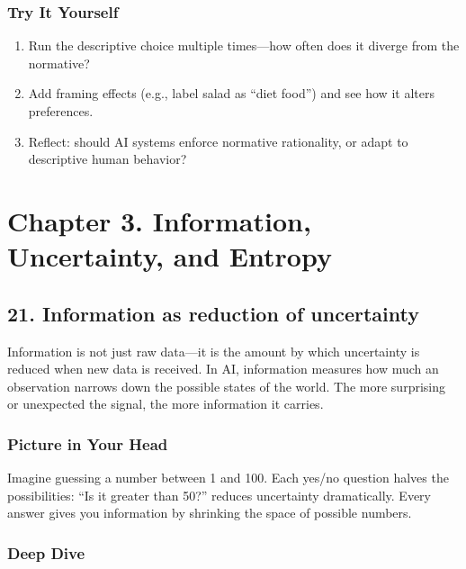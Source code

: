 \documentclass[
  letterpaper,
  DIV=11,
  numbers=noendperiod]{scrreprt}
\providecommand{\tightlist}{%
  \setlength{\itemsep}{0pt}\setlength{\parskip}{0pt}}
\begin{document}
\subsubsection{Try It Yourself}\label{try-it-yourself-19}

\begin{enumerate}
\def\labelenumi{\arabic{enumi}.}
\tightlist
\item
  Run the descriptive choice multiple times---how often does it diverge
  from the normative?
\item
  Add framing effects (e.g., label salad as ``diet food'') and see how
  it alters preferences.
\item
  Reflect: should AI systems enforce normative rationality, or adapt to
  descriptive human behavior?
\end{enumerate}

\section{Chapter 3. Information, Uncertainty, and
Entropy}\label{chapter-3.-information-uncertainty-and-entropy}

\subsection{21. Information as reduction of
uncertainty}\label{information-as-reduction-of-uncertainty}

Information is not just raw data---it is the amount by which uncertainty
is reduced when new data is received. In AI, information measures how
much an observation narrows down the possible states of the world. The
more surprising or unexpected the signal, the more information it
carries.

\subsubsection{Picture in Your Head}\label{picture-in-your-head-20}

Imagine guessing a number between 1 and 100. Each yes/no question halves
the possibilities: ``Is it greater than 50?'' reduces uncertainty
dramatically. Every answer gives you information by shrinking the space
of possible numbers.

\subsubsection{Deep Dive}\label{deep-dive-20}
\end{document}
